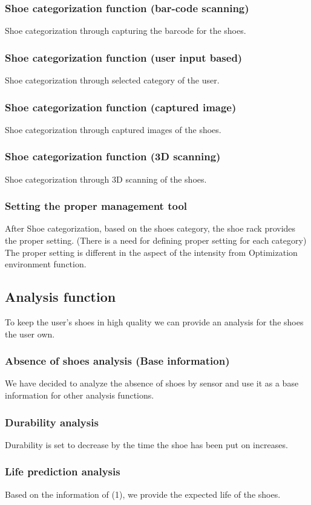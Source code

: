 \documentclass[conference]{IEEEtran}
\begin{document}
\subsubsection{Shoe categorization function (bar-code scanning)}
Shoe categorization through capturing the barcode for the shoes.
\subsubsection{Shoe categorization function (user input based)}
Shoe categorization through selected category of the user.
\subsubsection{Shoe categorization function (captured image)}
Shoe categorization through captured images of the shoes.
\subsubsection{Shoe categorization function (3D scanning)}
Shoe categorization through 3D scanning of the shoes.
\subsubsection{Setting the proper management tool}
After Shoe categorization, based on the shoes category, the shoe rack provides the proper setting.
(There is a need for defining proper setting for each category)
The proper setting is different in the aspect of the intensity from Optimization environment function.\\


\subsection{Analysis function}
To keep the user's shoes in high quality we can provide an analysis for the shoes the user own.
\subsubsection{Absence of shoes analysis (Base information)}
We have decided to analyze the absence of shoes by sensor and use it as a base information for other analysis functions.
\subsubsection{Durability analysis}
Durability is set to decrease by the time the shoe has been put on increases. 
\subsubsection{Life prediction analysis}
Based on the information of (1), we provide the expected  life of the shoes.
\end{document}
